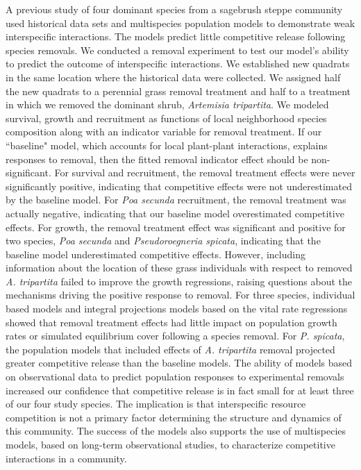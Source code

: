 \documentclass[11pt]{article}
\begin{document}
\begin{doublespacing}
A previous study of four dominant species from a sagebrush steppe community used historical data sets and multispecies population models to demonstrate weak interspecific interactions. The models predict little competitive release following species removals. We conducted a removal experiment to test our model's ability to predict the outcome of interspecific interactions. We established new quadrats in the same location where the historical data were collected. We assigned half the new quadrats to a  perennial grass removal treatment and half to a treatment in which we removed the dominant shrub, \textit{Artemisia tripartita}. We modeled survival, growth and recruitment as functions of local neighborhood species composition along with an indicator variable for removal treatment. If our ``baseline" model, which accounts for local plant-plant interactions, explains responses to removal, then the fitted removal indicator effect should be non-significant. For survival and recruitment, the removal treatment effects were never significantly positive, indicating that competitive effects were not underestimated by the baseline model. For  \textit{Poa secunda} recruitment, the removal treatment was actually negative, indicating that our baseline model overestimated competitive effects. For growth, the removal treatment effect was significant and positive for two species, \textit{Poa secunda} and \textit{Pseudoroegneria spicata}, indicating that the baseline model underestimated competitive effects. However, including information about the location of these grass individuals with respect to removed \textit{A. tripartita} failed to improve the growth regressions, raising questions about the mechanisms driving the positive response to removal. For three species, individual based models and integral projections models based on the vital rate regressions showed that removal treatment effects had little impact on population growth rates or simulated equilibrium cover following a species removal. For \textit{P. spicata}, the population models that included effects of \textit{A. tripartita} removal projected greater competitive release than the baseline models. The ability of models based on observational data to predict population responses to experimental removals increased our confidence that competitive release is in fact small for at least three of our four study species. The implication is that interspecific resource competition is not a primary factor determining the structure and dynamics of this community. The success of the models also supports the use of multispecies models, based on long-term observational studies, to characterize competitive interactions in a community. 



\end{doublespacing}
\end{document}
